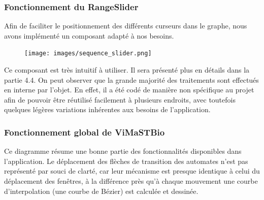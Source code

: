 \bigbreak
\subsubsection{Fonctionnement du RangeSlider}
\bigbreak
Afin de faciliter le positionnement des différents curseurs dans le graphe, nous avons implémenté un composant adapté à nos besoins.

\begin{figure}[!h]
  \bigbreak
  \centering
  \texttt{[image: images/sequence\_slider.png]}
\end{figure}

\bigbreak

Ce composant est très intuitif à utiliser. Il sera présenté plus en détails dans la partie 4.4. On peut observer que la grande majorité des traitements sont effectués en interne par l’objet. En effet, il a été codé de manière non spécifique au projet afin de pouvoir être réutilisé facilement à plusieurs endroits, avec toutefois quelques légères variations inhérentes aux besoins de l’application.

\bigbreak

\subsubsection{Fonctionnement global de ViMaSTBio}

Ce diagramme résume une bonne partie des fonctionnalités disponibles dans l’application. Le déplacement des flèches de transition des automates n’est pas représenté par souci de clarté, car leur mécanisme est presque identique à celui du déplacement des fenêtres, à la différence près qu’à chaque mouvement une courbe d’interpolation (une courbe de Bézier) est calculée et dessinée.

